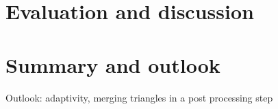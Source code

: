 
\chapter{Evaluation and discussion}



\chapter{Summary and outlook}



Outlook:
adaptivity, merging triangles in a post processing step